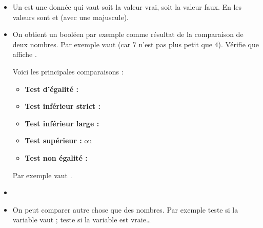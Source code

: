 \documentclass[11pt,class=report,crop=false]{standalone}
\begin{document}
\begin{cours}[Booléens]
\sauteligne
\begin{itemize}
  \item Un  est une donnée qui vaut soit la valeur \og{}vrai\fg{}, soit la valeur \og{}faux\fg{}. En \Python{} les valeurs sont  et  (avec une majuscule).
  
  \item On obtient un booléen par exemple comme résultat de la comparaison de deux nombres.
  Par exemple  vaut  (car $7$ n'est pas plus petit que $4$). 
  Vérifie que  affiche .
  
  Voici les principales comparaisons :
  \begin{itemize}
    \item \textbf{Test d'égalité :}\quad {}\index{\ci{==}}
    	\item \textbf{Test inférieur strict :}\quad {}
    	\item \textbf{Test inférieur large :}\quad {}\index{\ci{<=}}
    	\item \textbf{Test supérieur :}\quad {} \quad ou \quad {}\index{\ci{>=}}
    	\item \textbf{Test non égalité :}\quad {}
  \end{itemize}
   
   Par exemple  vaut .
   

   
   
   \item ~
   
  \item On peut comparer autre chose que des nombres. Par exemple 
  \og{}\fg{} teste si la variable  vaut  ; \og{}\fg{} teste si la variable  est vraie\ldots
  

\end{itemize}
\end{cours}
\end{document}
